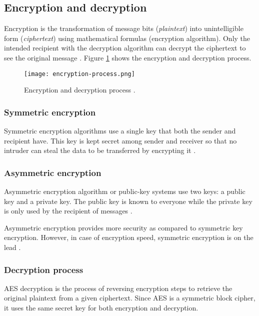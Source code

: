 \subsection{Encryption and decryption}

Encryption is the transformation of message bits (\textit{plaintext}) into unintelligible form (\textit{ciphertext}) using mathematical formulas (encryption algorithm).
Only the intended recipient with the decryption algorithm can decrypt the ciphertext to see the original message \cite{Devi_2019}.
Figure \ref{fig:encryption-process.png} shows the encryption and decryption process.

\begin{figure}[!ht]
    \centering
    \texttt{[image: encryption-process.png]}
    \caption{Encryption and decryption process \cite{Bhanot_2015}.}
    \label{fig:encryption-process.png}
\end{figure}


\subsubsection{Symmetric encryption}

Symmetric encryption algorithms use a single key that both the sender and recipient have.
This key is kept secret among sender and receiver so that no intruder can steal the data to be transferred by encrypting it  \cite{Bhanot_2015}.


\subsubsection{Asymmetric encryption}

Asymmetric encryption algorithm or public-key systems use two keys: a public key and a private key.
The public key is known to everyone while the private key is only used by the recipient of messages \cite{Bhanot_2015}.

Asymmetric encryption provides more security as compared to symmetric key encryption.
However, in case of encryption speed, symmetric encryption is on the lead \cite{Bhanot_2015}.

\subsubsection{Decryption process}
\label{sec:decryption}

AES decryption is the process of reversing encryption steps to retrieve the original plaintext from a given ciphertext. Since AES is a symmetric block cipher, it uses the same secret key for both encryption and decryption\cite{NIST_AES}.

